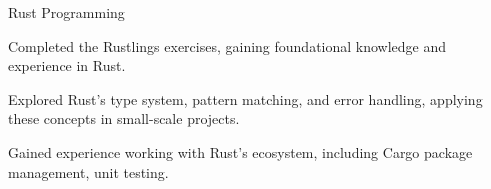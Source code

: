 \begin{cventries}
  \cventry
    {Rust Programming} %
    {} %
    {} %
    {} %
    {
      \begin{cvitems}
        \item {Completed the Rustlings exercises, gaining foundational knowledge and experience in Rust.}
        \item {Explored Rust’s type system, pattern matching, and error handling, applying these concepts in small-scale projects.}
        \item {Gained experience working with Rust’s ecosystem, including Cargo package management, unit testing.}
      \end{cvitems}
    }


\end{cventries}
